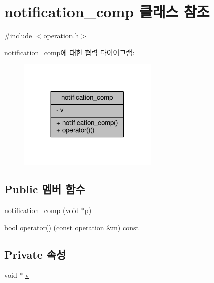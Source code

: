 \hypertarget{classavdecc__lib_1_1notification__comp}{}\section{notification\+\_\+comp 클래스 참조}
\label{classavdecc__lib_1_1notification__comp}


{\ttfamily \#include $<$operation.\+h$>$}



notification\+\_\+comp에 대한 협력 다이어그램\+:
\nopagebreak
\begin{figure}[H]
\begin{center}
\leavevmode
\includegraphics[width=188pt]{classavdecc__lib_1_1notification__comp__coll__graph}
\end{center}
\end{figure}
\subsection*{Public 멤버 함수}
\begin{DoxyCompactItemize}
\item 
\hyperlink{classavdecc__lib_1_1notification__comp_a4ba96654347f2478566781f016e224a7}{notification\+\_\+comp} (void $\ast$p)
\item 
\hyperlink{avb__gptp_8h_af6a258d8f3ee5206d682d799316314b1}{bool} \hyperlink{classavdecc__lib_1_1notification__comp_a0be57f4eb951c223c3dac12036d76b9e}{operator()} (const \hyperlink{classavdecc__lib_1_1operation}{operation} \&m) const 
\end{DoxyCompactItemize}
\subsection*{Private 속성}
\begin{DoxyCompactItemize}
\item 
void $\ast$ \hyperlink{classavdecc__lib_1_1notification__comp_a67806b49e20fb1170422969965db6ecb}{v}
\end{DoxyCompactItemize}


